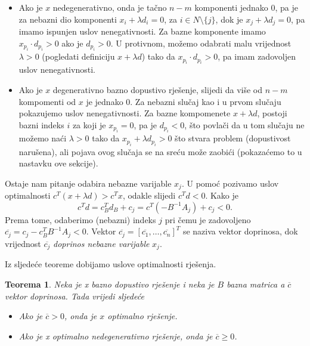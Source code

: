 \documentclass[a4paper, utf8, 11pt, colorlinks]{book}
\newtheorem{thm}{Teorema}
\begin{document}
\begin{itemize}
    \item Ako je $x$ nedegenerativno, onda je tačno $n-m$ komponenti jednako 0,       pa je za nebazni dio komponenti $x_i + \lambda d_i = 0$, za $i \in N \setminus \{j\}$, dok je $x_j + \lambda d_j = 0$, pa imamo ispunjen uslov nenegativnosti. Za bazne komponente imamo $x_{p_i} \cdot d_{p_i} > 0 $ ako je $d_{p_i}>0$. U protivnom, možemo odabrati  malu vrijednost  $\lambda>0$ (pogledati definiciju $x +\lambda d$) tako da $x_{p_i} \cdot d_{p_i} >0$, pa imam zadovoljen uslov nenegativnosti.
    \item Ako je $x$ degenerativno bazno dopustivo rješenje, slijedi da više od $n-m$ kompomenti od $x$ je jednako 0. Za nebazni slučaj kao i u prvom slučaju pokazujemo uslov nenegativnosti. Za bazne kompomenete $x +\lambda d$,  postoji bazni indeks $i$ za koji je $x_{p_i} = 0$, pa   je $d_{p_i}< 0$, što povlači da u tom slučaju ne možemo naći $\lambda>0$ tako da $x_{p_i} + \lambda d_{p_i} >0$  što stvara problem (dopustivost narušena), ali pojava ovog slučaja se na sreću može zaobići (pokazaćemo to u nastavku ove sekcije). 
\end{itemize}
 Ostaje nam pitanje odabira nebazne varijable $x_j$. U pomoć pozivamo uslov optimalnosti $c^T ( x + \lambda d ) > c^T x $, odakle slijedi $c^T d < 0$.  Kako je $$c^T d = c_B^T d_B + c_j = c^T ( - B^{-1} A_j ) + c_j < 0.$$
 Prema tome, odaberimo (nebazni) indeks $j$ pri čemu je zadovoljeno $ \overline{c_j} = c_j - c_B^T B^{-1}A_j < 0$. Vektor $\overline{c_j}=[\overline{c_1}, \ldots, \overline{c_n}]^T$ se naziva vektor doprinosa, dok vrijednost $\overline{c_j}$ \emph{doprinos nebazne varijable} $x_j$. 
 
Iz sljedeće teoreme dobijamo uslove optimalnosti rješenja.

\begin{thm}
  Neka je x bazno dopustivo rješenje i neka je $B$ bazna matrica a $\overline{c}$ vektor doprinosa. Tada vrijedi sljedeće
  \begin{itemize}
      \item Ako je $\overline{c} >0$, onda je $x$ optimalno rješenje.
      \item Ako je x optimalno nedegenerativno rješenje, onda je $\overline{c} \geq 0$.
  \end{itemize}
\end{thm}
\end{document}
